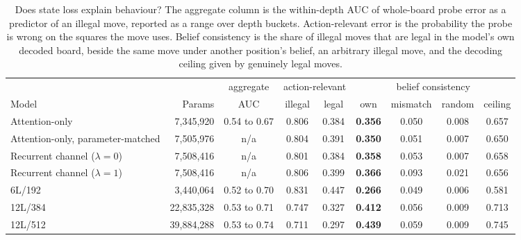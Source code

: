 \begin{table}[t]
\centering\small
\caption{Does state loss explain behaviour? The aggregate column is the
within-depth AUC of whole-board probe error as a predictor of an illegal
move, reported as a range over depth buckets. Action-relevant error is the
probability the probe is wrong
on the squares the move uses. Belief consistency is the share of illegal
moves that are legal in the model's own decoded board, beside the same
move under another position's belief, an arbitrary illegal move, and the
decoding ceiling given by genuinely legal moves.}
\label{tab:mechanism}
\begin{tabular}{lrccccccc}
\toprule
& & aggregate & \multicolumn{2}{c}{action-relevant} & \multicolumn{4}{c}{belief consistency} \\
\cmidrule(lr){4-5}\cmidrule(lr){6-9}
Model & Params & AUC & illegal & legal & own & mismatch & random & ceiling \\
\midrule
Attention-only & 7{,}345{,}920 & 0.54 to 0.67 & 0.806 & 0.384 & \textbf{0.356} & 0.050 & 0.008 & 0.657 \\
Attention-only, parameter-matched & 7{,}505{,}976 & n/a & 0.804 & 0.391 & \textbf{0.350} & 0.051 & 0.007 & 0.650 \\
Recurrent channel ($\lambda{=}0$) & 7{,}508{,}416 & n/a & 0.801 & 0.384 & \textbf{0.358} & 0.053 & 0.007 & 0.658 \\
Recurrent channel ($\lambda{=}1$) & 7{,}508{,}416 & n/a & 0.806 & 0.399 & \textbf{0.366} & 0.093 & 0.021 & 0.656 \\
6L/192 & 3{,}440{,}064 & 0.52 to 0.70 & 0.831 & 0.447 & \textbf{0.266} & 0.049 & 0.006 & 0.581 \\
12L/384 & 22{,}835{,}328 & 0.53 to 0.71 & 0.747 & 0.327 & \textbf{0.412} & 0.056 & 0.009 & 0.713 \\
12L/512 & 39{,}884{,}288 & 0.53 to 0.74 & 0.711 & 0.297 & \textbf{0.439} & 0.059 & 0.009 & 0.745 \\
\bottomrule
\end{tabular}
\end{table}
